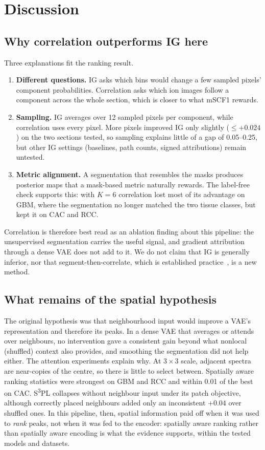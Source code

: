 \section{Discussion}
\label{sec:discussion}

\subsection{Why correlation outperforms IG here}
Three explanations fit the ranking result.
\begin{enumerate}
  \item \textbf{Different questions.} IG asks which bins would change a few
        sampled pixels' component probabilities. Correlation asks which ion
        images follow a component across the whole section, which is closer to
        what mSCF1 rewards.
  \item \textbf{Sampling.} IG averages over 12 sampled pixels per component,
        while correlation uses every pixel. More pixels improved IG only
        slightly ($\le +0.024$) on the two sections tested, so sampling
        explains little of a gap of 0.05--0.25, but other IG settings
        (baselines, path counts, signed attributions) remain untested.
  \item \textbf{Metric alignment.} A segmentation that resembles the masks
        produces posterior maps that a mask-based metric naturally rewards.
        The label-free check supports this: with $K=6$ correlation lost most
        of its advantage on GBM, where the segmentation no longer matched the
        two tissue classes, but kept it on CAC and RCC.
\end{enumerate}
Correlation is therefore best read as an ablation finding about this pipeline:
the unsupervised segmentation carries the useful signal, and gradient attribution
through a dense VAE does not add to it. We do not claim that IG is generally
inferior, nor that segment-then-correlate, which is established
practice~\citep{alexandrov2010spatial}, is a new method.

\subsection{What remains of the spatial hypothesis}
The original hypothesis was that neighbourhood input would improve a VAE's
representation and therefore its peaks. In a dense VAE that averages or attends
over neighbours, no intervention gave a consistent gain beyond what nonlocal
(shuffled) context also provides, and smoothing the segmentation did not help
either. The attention experiments explain why. At $3\times3$ scale, adjacent
spectra are near-copies of the centre, so there is little to select between.
Spatially aware ranking statistics were strongest on GBM and RCC and within
0.01 of the best on CAC. S\textsuperscript{3}PL collapses without neighbour input
under its patch objective, although correctly placed neighbours added only an
inconsistent $+0.04$ over shuffled ones. In this pipeline, then, spatial
information paid off when it was used to \emph{rank} peaks, not when it was fed
to the encoder: spatially aware ranking rather than spatially aware encoding is
what the evidence supports, within the tested models and datasets.

